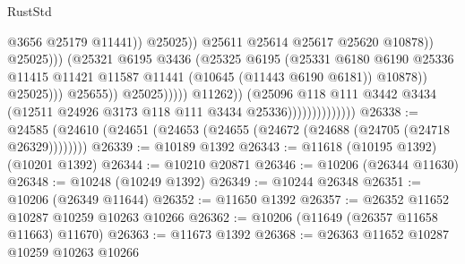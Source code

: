 \begin{lexlean}{RustStd}
\begin{coremodule}
                                                                    @3656
                                                                    @25179
                                                                    @11441))
                                                                @25025))
                                                            @25611
                                                            @25614
                                                            @25617
                                                            @25620
                                                            @10878))
                                                        @25025)))
                                                  (@25321
                                                    @6195
                                                    @3436
                                                    (@25325
                                                      @6195
                                                      (@25331
                                                        @6180
                                                        @6190
                                                        @25336
                                                        @11415
                                                        @11421
                                                        @11587
                                                        @11441
                                                        (@10645 (@11443 @6190 @6181))
                                                        @10878))
                                                    @25025)))
                                              @25655))
                                          @25025)))))
                                @11262))
                            (@25096
                              @118
                              @111
                              @3442
                              @3434
                              (@12511 @24926 @3173 @118 @111 @3434 @25336))))))))))))))
@26338 := @24585 (@24610 (@24651 (@24653 (@24655 (@24672 (@24688 (@24705 (@24718 @26329))))))))
@26339 := @10189 @1392
@26343 := @11618 (@10195 @1392) (@10201 @1392)
@26344 := @10210 @20871
@26346 := @10206 (@26344 @11630)
@26348 := @10248 (@10249 @1392)
@26349 := @10244 @26348
@26351 := @10206 (@26349 @11644)
@26352 := @11650 @1392
@26357 := @26352 @11652 @10287 @10259 @10263 @10266
@26362 := @10206 (@11649 (@26357 @11658 @11663) @11670)
@26363 := @11673 @1392
@26368 := @26363 @11652 @10287 @10259 @10263 @10266

\end{coremodule}
\end{lexlean}
